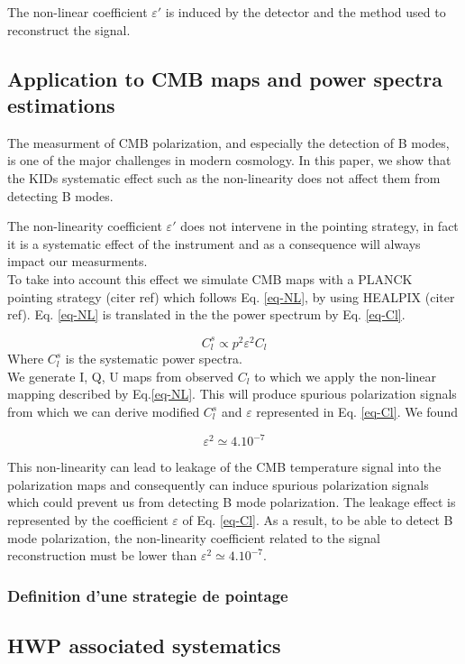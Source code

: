 The non-linear coefficient $\varepsilon'$ is induced by the detector and the method used to reconstruct the signal.

\subsection{Application to CMB maps and power spectra estimations}
The measurment of CMB polarization, and especially the detection of B modes, is one of the major challenges in modern cosmology. In this paper, we show that the KIDs systematic effect such as the non-linearity does not affect them from detecting B modes.

The non-linearity coefficient $\varepsilon'$ does not intervene in the pointing strategy, in fact it is a systematic effect of the instrument and as a consequence will always impact our measurments. \\
To take into account this effect we simulate CMB maps with a PLANCK pointing strategy (citer ref) which follows Eq. \ref{eq-NL}, by using HEALPIX (citer ref).
Eq. \ref{eq-NL} is translated in the the power spectrum by Eq. \ref{eq-Cl}.

\begin{equation}
C_{l}^{s} \propto p^{2} \varepsilon^{2} C_{l}
\label{eq-Cl}
\end{equation}
Where $C_{l}^{s}$ is the systematic power spectra.\\

We generate I, Q, U maps from observed $C_{l}$ to which we apply the non-linear mapping described by Eq.\ref{eq-NL}. This will produce spurious polarization signals from which we can derive modified $C_{l}^{s}$ and $\varepsilon$ represented in Eq. \ref{eq-Cl}. We found 

\begin{equation}
\varepsilon^{2} \simeq 4.10^{-7}
\label{epsilon}
\end{equation}

This non-linearity can lead to leakage of the CMB temperature signal into the polarization maps and consequently can induce spurious polarization signals which could prevent us from detecting B mode polarization. The leakage effect is represented by the coefficient $\varepsilon$ of Eq. \ref{eq-Cl}. As a result, to be able to detect B mode polarization, the non-linearity coefficient related to the signal reconstruction must be lower than $\varepsilon^{2} \simeq 4.10^{-7}$.



\subsubsection{Definition d'une strategie de pointage}

\subsection{HWP associated systematics}
